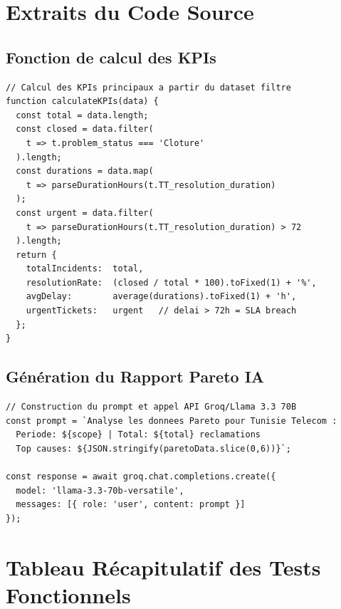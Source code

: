 \documentclass[11pt,a4paper]{report}
\begin{document}
\appendix
\chapter{Extraits du Code Source}

\section{Fonction de calcul des KPIs}

\begin{lstlisting}[style=jsStyle, caption={Fonction calculateKPIs -- Next.js API Route}, label={lst:kpi}]
// Calcul des KPIs principaux a partir du dataset filtre
function calculateKPIs(data) {
  const total = data.length;
  const closed = data.filter(
    t => t.problem_status === 'Cloture'
  ).length;
  const durations = data.map(
    t => parseDurationHours(t.TT_resolution_duration)
  );
  const urgent = data.filter(
    t => parseDurationHours(t.TT_resolution_duration) > 72
  ).length;
  return {
    totalIncidents:  total,
    resolutionRate:  (closed / total * 100).toFixed(1) + '%',
    avgDelay:        average(durations).toFixed(1) + 'h',
    urgentTickets:   urgent   // delai > 72h = SLA breach
  };
}
\end{lstlisting}

\section{Génération du Rapport Pareto IA}

\begin{lstlisting}[style=jsStyle, caption={Appel API Groq -- rapport Pareto intelligent}, label={lst:pareto}]
// Construction du prompt et appel API Groq/Llama 3.3 70B
const prompt = `Analyse les donnees Pareto pour Tunisie Telecom :
  Periode: ${scope} | Total: ${total} reclamations
  Top causes: ${JSON.stringify(paretoData.slice(0,6))}`;

const response = await groq.chat.completions.create({
  model: 'llama-3.3-70b-versatile',
  messages: [{ role: 'user', content: prompt }]
});
\end{lstlisting}

\chapter{Tableau Récapitulatif des Tests Fonctionnels}
\end{document}
